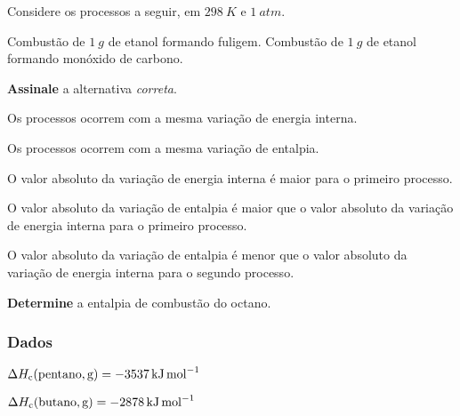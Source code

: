 \documentclass[braun, twocolumn]{braun}
\begin{document}
\begin{problem}
[2A36]Considere os processos a seguir, em \(\qty{298}{K}\) e \(\qty{1}{atm}\).

Combustão de \(\qty{1}{g}\) de etanol formando fuligem. Combustão de
\(\qty{1}{g}\) de etanol formando monóxido de carbono.

\textbf{Assinale} a alternativa \emph{correta}.


\begin{choices}

\item Os processos ocorrem com a mesma variação de energia interna.

\item Os processos ocorrem com a mesma variação de entalpia.

\item O valor absoluto da variação de energia interna é maior para o primeiro
processo.

\item O valor absoluto da variação de entalpia é maior que o valor absoluto da
variação de energia interna para o primeiro processo.

\item O valor absoluto da variação de entalpia é menor que o valor absoluto da
variação de energia interna para o segundo processo.

\end{choices}

\end{problem}



\begin{problem}
[2A37]\textbf{Determine} a entalpia de combustão do octano.
\subsubsection*{Dados}


\begin{datalist}

\item $\Delta H_\text{c}(\ce{pentano, {g}}) = \qty{-3537}{kJ.mol^{-1}}$
\item $\Delta H_\text{c}(\ce{butano, {g}}) = \qty{-2878}{kJ.mol^{-1}}$
\end{datalist}

\end{problem}
\end{document}
